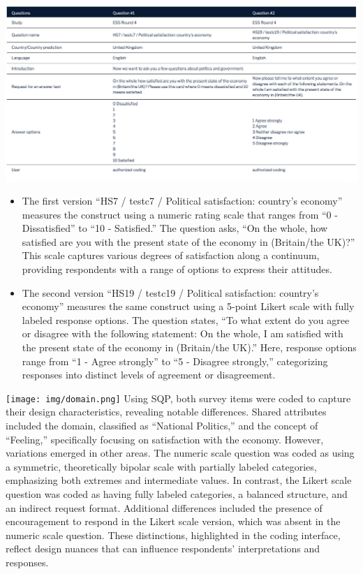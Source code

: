 \documentclass[
  letterpaper,
  DIV=11,
  numbers=noendperiod]{scrartcl}
\begin{document}
\includegraphics{img/ukeconomy.png}

\begin{itemize}
\item
  The first version ``HS7 / testc7 / Political satisfaction: country's
  economy'' measures the construct using a numeric rating scale that
  ranges from ``0 - Dissatisfied'' to ``10 - Satisfied.'' The question
  asks, ``On the whole, how satisfied are you with the present state of
  the economy in (Britain/the UK)?'' This scale captures various degrees
  of satisfaction along a continuum, providing respondents with a range
  of options to express their attitudes.
\item
  The second version ``HS19 / testc19 / Political satisfaction:
  country's economy'' measures the same construct using a 5-point Likert
  scale with fully labeled response options. The question states, ``To
  what extent do you agree or disagree with the following statement: On
  the whole, I am satisfied with the present state of the economy in
  (Britain/the UK).'' Here, response options range from ``1 - Agree
  strongly'' to ``5 - Disagree strongly,'' categorizing responses into
  distinct levels of agreement or disagreement.
\end{itemize}

\texttt{[image: img/domain.png]} Using SQP, both survey items were coded
to capture their design characteristics, revealing notable differences.
Shared attributes included the domain, classified as ``National
Politics,'' and the concept of ``Feeling,'' specifically focusing on
satisfaction with the economy. However, variations emerged in other
areas. The numeric scale question was coded as using a symmetric,
theoretically bipolar scale with partially labeled categories,
emphasizing both extremes and intermediate values. In contrast, the
Likert scale question was coded as having fully labeled categories, a
balanced structure, and an indirect request format. Additional
differences included the presence of encouragement to respond in the
Likert scale version, which was absent in the numeric scale question.
These distinctions, highlighted in the coding interface, reflect design
nuances that can influence respondents' interpretations and responses.
\end{document}
